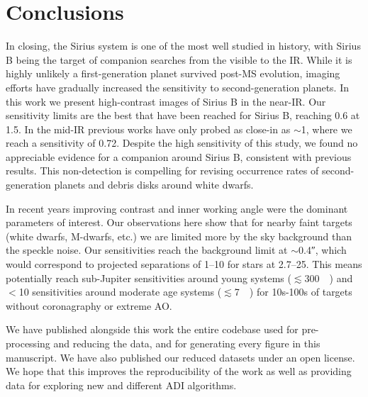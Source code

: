 \documentclass[twocolumn]{aastex631}
\begin{document}
\section{Conclusions} \label{sec:conclusion}

In closing, the Sirius system is one of the most well studied in history, with Sirius B being the target of companion searches from the visible to the IR. While it is highly unlikely a first-generation planet survived post-MS evolution, imaging efforts have gradually increased the sensitivity to second-generation planets. In this work we present high-contrast images of Sirius B in the near-IR. Our sensitivity limits are the best that have been reached for Sirius B, reaching \qty{0.6}{\jupitermass} at \qty{1.5}{\au}. In the mid-IR previous works have only probed as close-in as $\sim$\qty{1}{\au}, where we reach a sensitivity of \qty{0.72}{\jupitermass}. Despite the high sensitivity of this study, we found no appreciable evidence for a companion around Sirius B, consistent with previous results. This non-detection is compelling for revising occurrence rates of second-generation planets and debris disks around white dwarfs.

In recent years improving contrast and inner working angle were the dominant parameters of interest. Our observations here show that for nearby faint targets (white dwarfs, M-dwarfs, etc.) we are limited more by the sky background than the speckle noise. Our sensitivities reach the background limit at $\sim$\ang{;;0.4}, which would correspond to projected separations of \qtyrange{1}{10}{\au} for stars at \qtyrange{2.7}{25}{\parsec}. This means potentially reach sub-Jupiter sensitivities around young systems ($\lesssim$\qty{300}{\mega\year}) and $<$\qty{10}{\jupitermass} sensitivities around moderate age systems ($\lesssim$\qty{7}{\giga\year}) for 10s-100s of targets without coronagraphy or extreme AO.

We have published alongside this work the entire codebase used for pre-processing and reducing the data, and for generating every figure in this manuscript. We have also published our reduced datasets under an open license. We hope that this improves the reproducibility of the work as well as providing data for exploring new and different ADI algorithms.

\begin{acknowledgments}

\end{acknowledgments}

\end{document}
